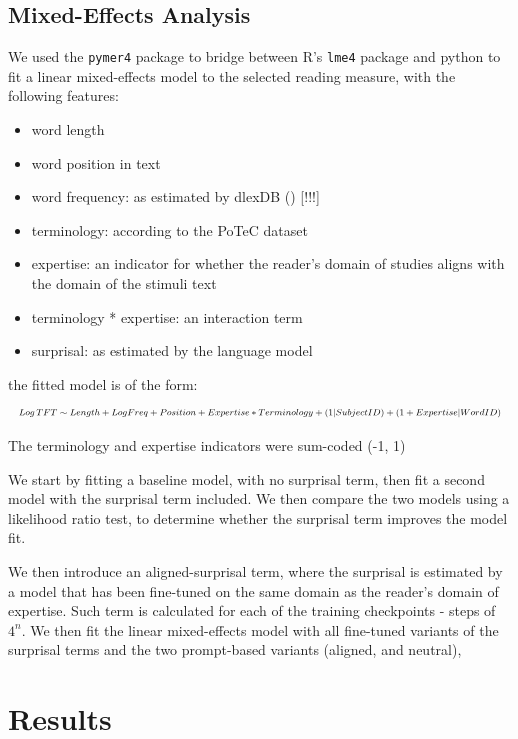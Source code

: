 \documentclass[10pt,letterpaper]{article}
\begin{document}
\subsection{Mixed-Effects Analysis}

We used the \texttt{pymer4} package to bridge between R's \texttt{lme4} package and python to fit a linear mixed-effects model to the selected reading measure, with the following features:

\begin{itemize}
  \item word length
  \item word position in text
  \item word frequency: as estimated by dlexDB () [!!!]
  \item terminology: according to the PoTeC dataset
  \item expertise: an indicator for whether the reader's domain of studies aligns with the domain of the stimuli text
  \item terminology * expertise: an interaction term
  \item surprisal: as estimated by the language model
\end{itemize}

the fitted model is of the form:
\begin{equation}
\resizebox{\columnwidth}{!}{$Log\,TFT \sim Length + LogFreq + Position + Expertise * Terminology + (1 | SubjectID) + (1 + Expertise | WordID)$}
\end{equation}

The terminology and expertise indicators were sum-coded (-1, 1)

We start by fitting a baseline model, with no surprisal term, then fit a second model with the surprisal term included.
We then compare the two models using a likelihood ratio test, to determine whether the surprisal term improves the model fit.

We then introduce an aligned-surprisal term, where the surprisal is estimated by a model that has been fine-tuned on the same domain as the reader's domain of expertise.
Such term is calculated for each of the training checkpoints - steps of $4^n$.
We then fit the linear mixed-effects model with all fine-tuned variants of the surprisal terms and the two prompt-based variants (aligned, and neutral),

\section{Results}
\end{document}
